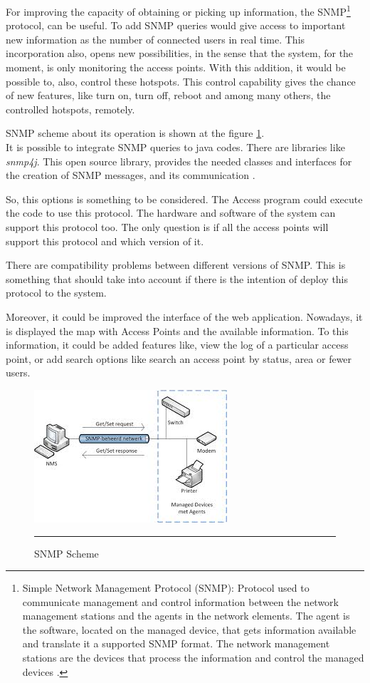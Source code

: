 \documentclass[12pt, a4paper,twoside]{tesi_upf}
\begin{document}
For improving the capacity of obtaining or picking up information, the SNMP\footnote{Simple Network Management Protocol (SNMP): Protocol used to communicate management and control information between the network management stations and the agents in the network elements. The agent is the software, located on the managed device, that gets information available and translate it a supported SNMP format. The network management stations are the devices that process the information and control the managed devices \cite{SNMP}.} protocol, can be useful. To add SNMP queries would give access to important new information as the number of connected users in real time. This incorporation also, opens new possibilities, in the sense that the system, for the moment, is only monitoring the access points. With this addition, it would be possible to, also, control these hotspots. This control capability gives the chance of new features, like turn on, turn off, reboot and among many others, the controlled hotspots, remotely.

SNMP scheme about its operation is shown at the figure \ref{fig:snmp}.\\

It is possible to integrate SNMP queries to java codes. There are libraries like \textit{snmp4j}. This open source library, provides the needed classes and interfaces for the creation of SNMP messages, and its communication \cite{snmplibrary}.

So, this options is something to be considered. The Access program could execute the code to use this protocol. The hardware and software of the system can support this protocol too. The only question is if all the access points will support this protocol and which version of it. 

There are compatibility problems between different versions of SNMP. This is something that should take into account if there is the intention of deploy this protocol to the system.

Moreover, it could be improved the interface of the web application. Nowadays, it is displayed the map with Access Points and the available information. To this information, it could be added features like, view the log of a particular access point, or add search options like search an access point by status, area or fewer users.

     \begin{figure}[htbp]
          \centering
              \includegraphics[scale=1]{./figures/snmp.png}
              \rule{32em}{0.5pt}
            \caption[SNMP Scheme]{SNMP Scheme}
            \label{fig:snmp}
        \end{figure}
\end{document}
